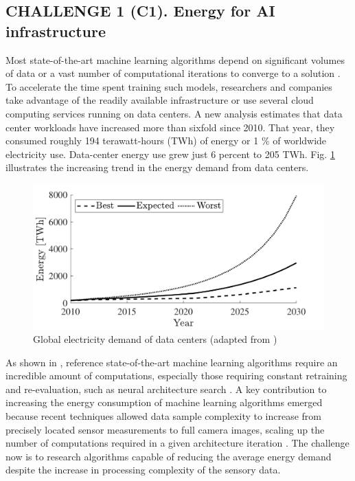 \subsection{\textbf{CHALLENGE 1} (C1). Energy for AI infrastructure}
Most state-of-the-art machine learning algorithms depend on significant volumes of data or a vast number of computational iterations to converge to a solution \cite{Strubell2019EnergyAP}. To accelerate the time spent training such models, researchers and companies take advantage of the readily available infrastructure or use several cloud computing services running on data centers. A new analysis estimates that data center workloads have increased more than sixfold since 2010. That year, they consumed roughly 194 terawatt-hours (TWh) of energy or 1 \% of worldwide electricity use. Data-center energy use grew just 6 percent to 205 TWh. Fig. \ref{fig:dataCenterEnergy} illustrates the increasing trend in the energy demand from data centers.
\begin{figure}[!t]
	\centering
	\includegraphics[width=0.9\columnwidth]{fig/data_center_energy_consumption.pdf}
	\caption{Global electricity demand of data centers (adapted from \cite{andrae2015global})}
	\label{fig:dataCenterEnergy}
\end{figure}
As shown in \cite{Strubell2019EnergyAP}, reference state-of-the-art machine learning algorithms require an incredible amount of computations, especially those requiring constant retraining and re-evaluation, such as neural architecture search \cite{real2019regularized}. A key contribution to increasing the energy consumption of machine learning algorithms emerged because recent techniques allowed data sample complexity to increase from precisely located sensor measurements to full camera images, scaling up the number of computations required in a given architecture iteration \cite{krizhevsky2012imagenet}. The challenge now is to research algorithms capable of reducing the average energy demand despite the increase in processing complexity of the sensory data.


